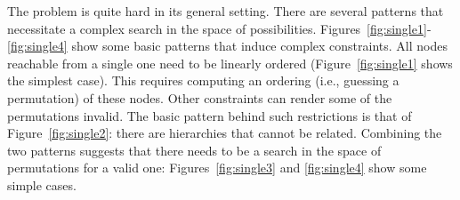

The problem is quite hard in its general setting. There are several
patterns that necessitate a complex search in the space of
possibilities. Figures~\ref{fig:single1}-\ref{fig:single4} show some
basic patterns that induce complex constraints. All nodes reachable
from a single one need to be linearly ordered
(Figure~\ref{fig:single1} shows the simplest case). This requires
computing an ordering (i.e., guessing a permutation) of these
nodes. Other constraints can render some of the permutations
invalid. The basic pattern behind such restrictions is that of
Figure~\ref{fig:single2}: there are hierarchies that cannot be
related. Combining the two patterns suggests that there needs to be a
search in the space of permutations for a valid one:
Figures~\ref{fig:single3} and \ref{fig:single4} show some simple
cases.


